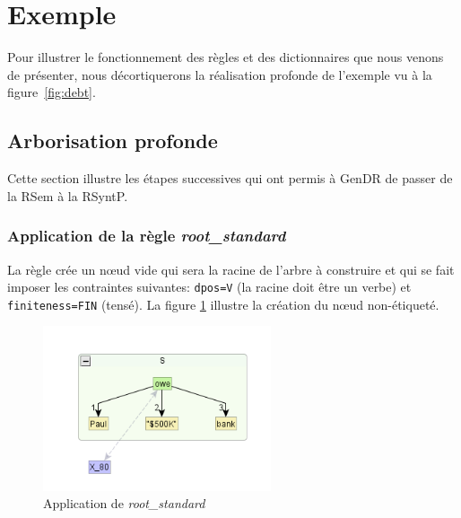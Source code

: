 
\section{Exemple}\label{sec:exemple}

Pour illustrer le fonctionnement des règles et des dictionnaires que nous venons de présenter, nous décortiquerons la réalisation profonde de l'exemple vu à la figure~\ref{fig:debt}.

\subsection{Arborisation profonde}

Cette section illustre les étapes successives qui ont permis à GenDR de passer de la \ac{RSem} à la \ac{RSyntP}.

\subsubsection{Application de la règle \emph{root\_standard}}
La règle crée un n\oe{}ud vide qui sera la racine de l'arbre à construire et qui se fait imposer les contraintes suivantes: \texttt{dpos=V} (la racine doit être un verbe) et \texttt{finiteness=FIN} (tensé). La figure \ref{fig:rootstand} illustre la création du n\oe{}ud non-étiqueté.
\begin{figure}[htb]
	\centering
	\includegraphics[width=0.6\textwidth, trim = {1cm 0.5cm 0cm 1cm},clip]{ch3/figs/inspecteur_root.png}
	\vspace{-0.5cm}
	\caption{Application de \emph{root\_standard}}
	\label{fig:rootstand}
\end{figure}

